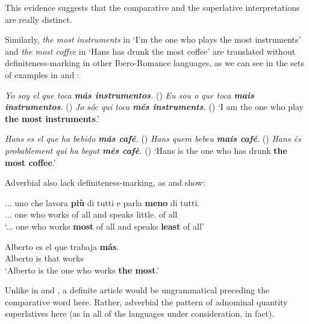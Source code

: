 \documentclass[output=paper
,modfonts
,nonflat]{langsci/langscibook}
\begin{document}
This evidence suggests that the comparative and the superlative interpretations are really distinct.

Similarly, \textit{the most instruments} in `I'm the one who plays the most instruments' and \textit{the most coffee} in `Hans has drunk the most coffee' are translated without definiteness-marking in other Ibero-Romance languages, as we can see in the sets of examples in  and :

\ea \label{ex:coppockstrand:70}
\settowidth{}
\ea \textit{Yo soy el que toca \textbf{más instrumentos}.} \jam()
\ex \textit{Eu sou o que toca \textbf{mais instrumentos}.} \jam()
\ex \textit{Jo sóc qui toca \textbf{més instruments}.} \jam ()
`I am the one who play \textbf{the most instruments}.'
\z 
\z

\ea \label{ex:coppockstrand:71}
\settowidth{}
\ea \textit{Hans es el que ha bebido \textbf{más café}.} \jam()
\ex \textit{Hans quem bebeu \textbf{mais café}.} \jam()
\ex \textit{Hans és probablement qui ha begut \textbf{més cafè}.} \jam()
\sn`Hans is the one who has drunk \textbf{the most coffee}.'
\z
\z 

Adverbial  also lack definiteness-marking, as  and  show:

\ea \label{ex:coppockstrand:72}
\gll ... uno che lavora \textbf{più} di tutti e parla \textbf{meno} di tutti. \\
... one who works \cmpr{} of all and speaks little.\cmpr{} of all\\ 
\glt `... one who works \textbf{most} of all and speaks \textbf{least} of all'
\z

\ea \label{ex:coppockstrand:73}
\gll Alberto es el que trabaja \textbf{m\'as}.\\
Alberto is  that works \cmpr\\ 
\glt `Alberto is the one who works \textbf{the most}.' 
\z

Unlike in  and , a definite article would be ungrammatical preceding the comparative word here. Rather, adverbial  the pattern of adnominal quantity superlatives here (as in all of the languages under consideration, in fact).
\end{document}
